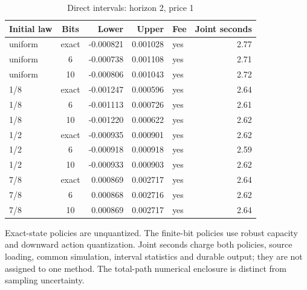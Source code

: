 \begin{table}[htbp]
\centering
\caption{Direct intervals: horizon 2, price 1}\label{tab:direct-full48-2-1}
\footnotesize
\begin{tabular}{lcrrlr}
\toprule
Initial law & Bits & Lower & Upper & Fee & Joint seconds\\
\midrule
uniform & exact & -0.000821 & 0.001028 & yes & 2.77 \\
uniform & 6 & -0.000738 & 0.001108 & yes & 2.71 \\
uniform & 10 & -0.000806 & 0.001043 & yes & 2.72 \\
1/8 & exact & -0.001247 & 0.000596 & yes & 2.64 \\
1/8 & 6 & -0.001113 & 0.000726 & yes & 2.61 \\
1/8 & 10 & -0.001220 & 0.000622 & yes & 2.62 \\
1/2 & exact & -0.000935 & 0.000901 & yes & 2.62 \\
1/2 & 6 & -0.000918 & 0.000918 & yes & 2.59 \\
1/2 & 10 & -0.000933 & 0.000903 & yes & 2.62 \\
7/8 & exact & 0.000869 & 0.002717 & yes & 2.64 \\
7/8 & 6 & 0.000868 & 0.002716 & yes & 2.62 \\
7/8 & 10 & 0.000869 & 0.002717 & yes & 2.64 \\
\bottomrule
\end{tabular}
\begin{minipage}{0.97\linewidth}\footnotesize\vspace{3pt}
Exact-state policies are unquantized. The finite-bit policies use robust capacity and downward action quantization. Joint seconds charge both policies, source loading, common simulation, interval statistics and durable output; they are not assigned to one method. The total-path numerical enclosure is distinct from sampling uncertainty.
\end{minipage}
\end{table}
